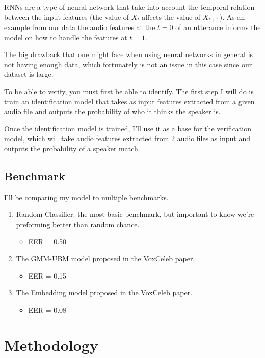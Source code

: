 \documentclass{article}
\begin{document}
RNNs are a type of neural network that take into account the temporal relation between the input features (the value of $X_t$ affects the value of $X_{t+1}$). As an example from our data the audio features at the $t=0$ of an utterance informs the model on how to handle the features at $t=1$.

The big drawback that one might face when using neural networks in general is not having enough data, which fortunately is not an issue in this case since our dataset is large.

To be able to verify, you must first be able to identify. The first step I will do is train an identification model that takes as input features extracted from a given audio file and outputs the probability of who it thinks the speaker is.

Once the identification model is trained, I'll use it as a base for the verification model, which will take audio features extracted from 2 audio files as input and outputs the probability of a speaker match.

\subsection{Benchmark}

I'll be comparing my model to multiple benchmarks.

\begin{enumerate}
    \item Random Classifier: the most basic benchmark, but important to know we're preforming better than random chance.
    \begin{itemize}
        \item EER = 0.50
    \end{itemize}
    \item The GMM-UBM model proposed in the VoxCeleb paper.
    \begin{itemize}
        \item EER = 0.15
    \end{itemize}    
    \item The Embedding model proposed in the VoxCeleb paper.
    \begin{itemize}
        \item EER = 0.08
    \end{itemize}
\end{enumerate}

\section{Methodology}
\end{document}
